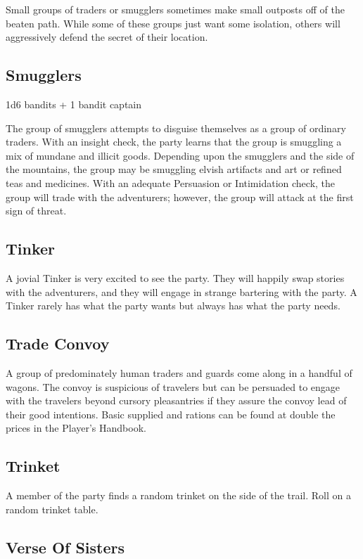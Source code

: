 Small groups of traders or smugglers sometimes make small outposts off of the beaten path.
While some of these groups just want some isolation, others will aggressively defend the secret of their location.

\subsection{Smugglers}

1d6 bandits + 1 bandit captain

The group of smugglers attempts to disguise themselves as a group of ordinary traders.
With an insight check, the party learns that the group is smuggling a mix of mundane and illicit goods.
Depending upon the smugglers and the side of the mountains, the group may be smuggling elvish artifacts and art or refined teas and medicines.
With an adequate Persuasion or Intimidation check, the group will trade with the adventurers; however, the group will attack at the first sign of threat.

\subsection{Tinker}

A jovial Tinker is very excited to see the party.
They will happily swap stories with the adventurers, and they will engage in strange bartering with the party.
A Tinker rarely has what the party wants but always has what the party needs.

\subsection{Trade Convoy}

A group of predominately human traders and guards come along in a handful of wagons.
The convoy is suspicious of travelers but can be persuaded to engage with the travelers beyond cursory pleasantries if they assure the convoy lead of their good intentions.
Basic supplied and rations can be found at double the prices in the Player's Handbook.

\subsection{Trinket}

A member of the party finds a random trinket on the side of the trail.
Roll on a random trinket table.

\subsection{Verse Of Sisters}

